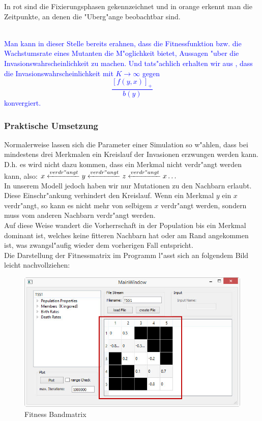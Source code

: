 \documentclass[11pt, a4paper, german]{article}
\theoremstyle{plain}
\begin{document}
	\begin{minipage}{0.3 \textwidth}
		In rot sind die Fixierungsphasen gekennzeichnet und in orange erkennt man die Zeitpunkte, an denen die "Uberg"ange beobachtbar sind.
	\end{minipage}\\
	
	\textcolor{blue}{Man kann in dieser Stelle bereits erahnen, dass die Fitnessfunktion bzw. die Wachstumsrate eines Mutanten die M"oglichkeit bietet, Aussagen "uber die Invasionswahrscheinlichkeit zu machen. Und tats"achlich erhalten wir aus \cite{Champagnat20061127}, dass die Invasionswahrscheinlichkeit mit $ K \to \infty $ gegen
	\[ \frac{\left[ f(y,x)\right]_+ }{b(y)} \]
	konvergiert.} 
	
	\subsubsection{Praktische Umsetzung}
	Normalerweise lassen sich die Parameter einer Simulation so w"ahlen, dass bei mindestens drei Merkmalen ein Kreislauf der Invasionen erzwungen werden kann. D.h. es wird nicht dazu kommen, dass ein Merkmal nicht verdr"angt werden kann, also: $ x \xleftarrow{verdr"angt} y \xleftarrow{verdr"angt} z \xleftarrow{verdr"angt} x \dots $\\
	In unserem Modell jedoch haben wir nur Mutationen zu den Nachbarn erlaubt. Diese Einschr"ankung verhindert den Kreislauf. Wenn ein Merkmal $ y $ ein $ x $ verdr"angt, so kann es nicht mehr von selbigem $ x $ verdr"angt werden, sondern muss vom anderen Nachbarn verdr"angt werden.\\
	Auf diese Weise wandert die Vorherrschaft in der Population bis ein Merkmal dominant ist, welches keine fitteren Nachbarn hat oder am Rand angekommen ist, was zwangsl"aufig wieder dem vorherigen Fall entspricht.\\
	Die Darstellung der Fitnessmatrix im Programm l"asst sich an folgendem Bild leicht nachvollziehen:
	\begin{figure}[H]
		\centering
		\includegraphics[width=1\linewidth]{./Pictures/MainWindow_BandMatrix}
		\caption[Fitness Matrix]{Fitness Bandmatrix}
		\label{MainWindow mit Fitness Bandmatrix}
	\end{figure}
\end{document}
